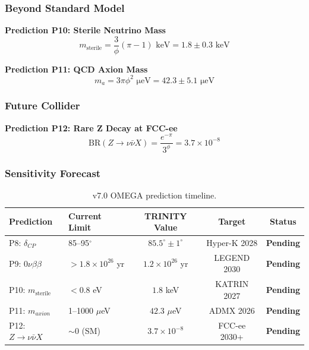 \documentclass[aps,prd,preprint,superscriptaddress,showpacs,nofootinbib,longbibliography]{revtex4-2}
\begin{document}
\subsubsection{Beyond Standard Model}

\textbf{Prediction P10: Sterile Neutrino Mass}
\begin{equation}
m_{\text{sterile}} = \frac{3}{\phi}(\pi - 1)\text{ keV} = 1.8 \pm 0.3\text{ keV}
\end{equation}

\textbf{Prediction P11: QCD Axion Mass}
\begin{equation}
m_a = 3\pi\phi^2 \text{ μeV} = 42.3 \pm 5.1\text{ μeV}
\end{equation}

\subsubsection{Future Collider}

\textbf{Prediction P12: Rare Z Decay at FCC-ee}
\begin{equation}
\text{BR}(Z \to \nu\bar{\nu}X) = \frac{e^{-\pi}}{3^\phi} = 3.7 \times 10^{-8}
\end{equation}

\subsubsection{Sensitivity Forecast}

\begin{table}[h]
\centering
\small
\begin{tabular}{llccc}
\toprule
Prediction & Current Limit & TRINITY Value & Target & Status \\
\midrule
P8: $\delta_{CP}$ & 85--95$^\circ$ & $85.5^\circ \pm 1^\circ$ & Hyper-K 2028 & \textbf{Pending} \\
P9: $0\nu\beta\beta$ & $>1.8\times10^{26}$ yr & $1.2\times10^{26}$ yr & LEGEND 2030 & \textbf{Pending} \\
P10: $m_{\text{sterile}}$ & $<0.8$ eV & $1.8$ keV & KATRIN 2027 & \textbf{Pending} \\
P11: $m_{axion}$ & 1--1000 $\mu$eV & $42.3$ $\mu$eV & ADMX 2026 & \textbf{Pending} \\
P12: $Z\to\nu\bar{\nu}X$ & $\sim0$ (SM) & $3.7\times10^{-8}$ & FCC-ee 2030+ & \textbf{Pending} \\
\bottomrule
\end{tabular}
\caption{v7.0 OMEGA prediction timeline.}
\end{table}
\end{document}
